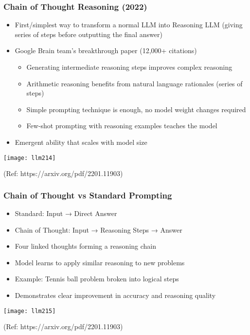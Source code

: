 \begin{frame}[fragile]\frametitle{Chain of Thought Reasoning (2022)}

      \begin{itemize}
	    \item First/simplest way to transform a normal LLM into Reasoning LLM (giving series of steps before outputting the final answer)
        \item Google Brain team's breakthrough paper (12,000+ citations)
			\begin{itemize}
			\item Generating intermediate reasoning steps improves complex reasoning
			\item Arithmetic reasoning benefits from natural language rationales (series of steps)
			\item Simple prompting technique is enough, no model weight changes required
			\item Few-shot prompting with reasoning examples teaches the model
		    \end{itemize}
		
        \item Emergent ability that scales with model size
      \end{itemize}

        \begin{center}
        \texttt{[image: llm214]}
		
		{\tiny (Ref: https://arxiv.org/pdf/2201.11903)}
        \end{center}	

\end{frame}

\begin{frame}[fragile]\frametitle{Chain of Thought vs Standard Prompting}

      \begin{itemize}
        \item Standard: Input → Direct Answer
        \item Chain of Thought: Input → Reasoning Steps → Answer
        \item Four linked thoughts forming a reasoning chain
        \item Model learns to apply similar reasoning to new problems
        \item Example: Tennis ball problem broken into logical steps
        \item Demonstrates clear improvement in accuracy and reasoning quality
      \end{itemize}

        \begin{center}
        \texttt{[image: llm215]}
		
		{\tiny (Ref: https://arxiv.org/pdf/2201.11903)}
        \end{center}	

\end{frame}

